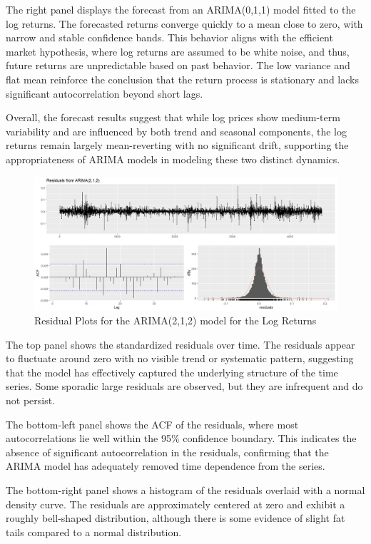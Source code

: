 \documentclass[12pt]{article}
\begin{document}
The right panel displays the forecast from an ARIMA(0,1,1) model fitted to the log returns. The forecasted returns converge quickly to a mean close to zero, with narrow and stable confidence bands. This behavior aligns with the efficient market hypothesis, where log returns are assumed to be white noise, and thus, future returns are unpredictable based on past behavior. The low variance and flat mean reinforce the conclusion that the return process is stationary and lacks significant autocorrelation beyond short lags.

Overall, the forecast results suggest that while log prices show medium-term variability and are influenced by both trend and seasonal components, the log returns remain largely mean-reverting with no significant drift, supporting the appropriateness of ARIMA models in modeling these two distinct dynamics.
\begin{figure}[h]
	\centering
	\includegraphics[width=1\linewidth]{plots/residual_plot_212.png}
	\caption{Residual Plots for the ARIMA(2,1,2) model for the Log Returns}
	\label{fig:residual_plot_212}
\end{figure}
The top panel shows the standardized residuals over time. The residuals appear to fluctuate around zero with no visible trend or systematic pattern, suggesting that the model has effectively captured the underlying structure of the time series. Some sporadic large residuals are observed, but they are infrequent and do not persist.

The bottom-left panel shows the ACF of the residuals, where most autocorrelations lie well within the 95\% confidence boundary. This indicates the absence of significant autocorrelation in the residuals, confirming that the ARIMA model has adequately removed time dependence from the series.

The bottom-right panel shows a histogram of the residuals overlaid with a normal density curve. The residuals are approximately centered at zero and exhibit a roughly bell-shaped distribution, although there is some evidence of slight fat tails compared to a normal distribution.
\end{document}
